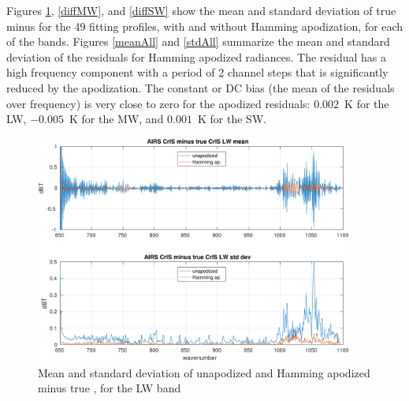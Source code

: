 \documentclass[11pt]{article}
\begin{document}

Figures \ref{diffLW}, \ref{diffMW}, and \ref{diffSW} show the mean
and standard deviation of true {\cris} minus {\airs} {\cris} for the
49 fitting profiles, with and without Hamming apodization, for each
of the {\cris} bands.  Figures \ref{meanAll} and \ref{stdAll}
summarize the mean and standard deviation of the residuals for
Hamming apodized radiances.  The residual has a high frequency
component with a period of 2 channel steps that is significantly
reduced by the apodization.  The constant or DC bias (the mean of
the residuals over frequency) is very close to zero for the apodized
residuals: $0.002$~K for the LW, $-0.005$~K for the MW, and
$0.001$~K for the SW.


\begin{figure} %
  \centering
  \includegraphics[height=7.5cm]{figures/a2cris_diff_LW.pdf}
  \caption{Mean and standard deviation of unapodized and Hamming
    apodized {\airs} {\cris} minus true {\cris}, for the {\cris} LW
    band}
  \label{diffLW}
\end{figure}
\end{document}
